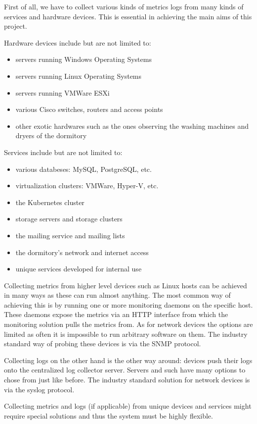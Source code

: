 First of all, we have to collect various kinds of metrics logs from many kinds
of services and hardware devices. This is essential in achieving the main aims
of this project.

Hardware devices include but are not limited to:
\begin{itemize}
	\item servers running Windows Operating Systems
	\item servers running Linux Operating Systems
	\item servers running VMWare ESXi
	\item various Cisco switches, routers and access points
	\item other exotic hardwares such as the ones observing the washing machines and dryers of the dormitory
\end{itemize}

Services include but are not limited to:
\begin{itemize}
	\item various databeses: MySQL, PostgreSQL, etc.
	\item virtualization clusters: VMWare, Hyper-V, etc.
	\item the Kubernetes cluster
	\item storage servers and storage clusters
	\item the mailing service and mailing lists
	\item the dormitory's network and internet access
	\item unique services developed for internal use
\end{itemize}

Collecting metrics from higher level devices such as Linux hosts can be
achieved in many ways as these can run almost anything. The most common way of
achieving this is by running one or more monitoring daemons on the specific host.
These daemons expose the metrics via an HTTP interface from which the
monitoring solution pulls the metrics from.  As for network devices the options
are limited as often it is impossible to run arbitrary software on them. The
industry standard way of probing these devices is via the SNMP protocol.

Collecting logs on the other hand is the other way around: devices push their
logs onto the centralized log collector server. Servers and such have many
options to chose from just like before. The industry standard solution for
network devices is via the syslog protocol.

Collecting metrics and logs (if applicable) from unique devices and services
might require special solutions and thus the system must be highly flexible.

